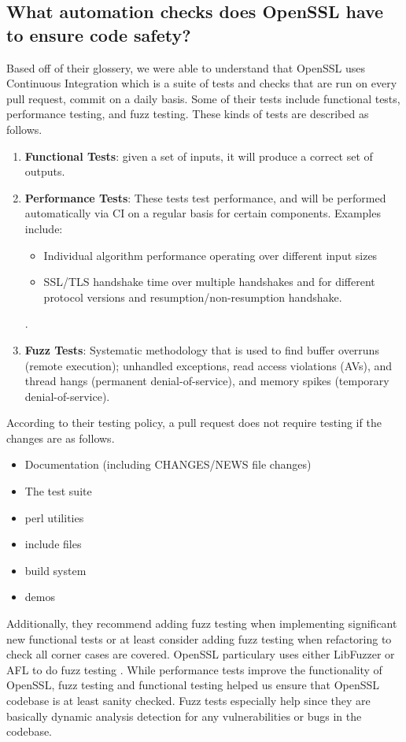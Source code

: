 \documentclass[conference]{IEEEtran}
\begin{document}
\subsection{What automation checks does OpenSSL have to ensure code safety?}
    Based off of their glossery, we were able to understand that OpenSSL uses
Continuous Integration which is a suite of tests and checks that are run on
every pull request, commit on a daily basis. Some of their tests include functional
tests, performance testing, and fuzz testing\cite{9}. These kinds of tests
are described as follows.
    \begin{enumerate}
        \item \textbf{Functional Tests}: given a set of inputs, it
        will produce a correct set of outputs\cite{9}.
        \item \textbf{Performance Tests}: These tests test
        performance, and will be performed automatically
        via CI on a regular basis for certain components. Examples include:
        \begin{itemize}
            \item Individual algorithm performance operating over different
            input sizes
            \item SSL/TLS handshake time over multiple handshakes and
            for different protocol versions and resumption/non-resumption
            handshake.
        \end{itemize}\cite{9}.
        \item \textbf{Fuzz Tests}: Systematic methodology that is used
        to find buffer overruns (remote execution); unhandled
        exceptions, read access violations (AVs), and thread hangs
        (permanent denial-of-service), and memory spikes (temporary denial-of-service)\cite{10}.
    \end{enumerate}
According to their testing policy, a pull request does not require testing
if the changes are as follows\cite{9}.
\begin{itemize}
    \item Documentation (including CHANGES/NEWS file changes)
    \item The test suite
    \item perl utilities
    \item include files
    \item build system
    \item demos
\end{itemize}
Additionally, they recommend adding fuzz testing when implementing significant new functional tests
or at least consider adding fuzz testing when refactoring to check all corner cases are covered\cite{9}.
OpenSSL particulary uses either LibFuzzer or AFL to do fuzz testing \cite{11}. While performance
tests improve the functionality of OpenSSL, fuzz testing and functional testing helped us ensure
that OpenSSL codebase is at least sanity checked. Fuzz tests especially help since they are
basically dynamic analysis detection for any vulnerabilities or bugs in the codebase.
\end{document}

